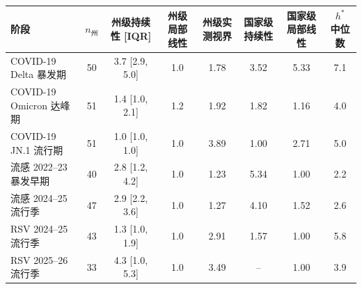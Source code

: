 \begin{tabular}{lccccccc}
\toprule
阶段 & $n_{\text{州}}$ & 州级持续性 [IQR] & 州级局部线性 & 州级实测视界 & 国家级持续性 & 国家级局部线性 & $h^*$ 中位数 \\
\midrule
COVID-19 Delta 暴发期 & 50 & 3.7 [2.9, 5.0] & 1.0 & 1.78 & 3.52 & 5.33 & 7.1 \\
COVID-19 Omicron 达峰期 & 51 & 1.4 [1.0, 2.1] & 1.2 & 1.92 & 1.82 & 1.16 & 4.0 \\
COVID-19 JN.1 流行期 & 51 & 1.0 [1.0, 1.0] & 1.0 & 3.89 & 1.00 & 2.71 & 5.0 \\
流感 2022--23 暴发早期 & 40 & 2.8 [1.2, 4.2] & 1.0 & 1.23 & 5.34 & 1.00 & 2.2 \\
流感 2024--25 流行季 & 47 & 2.9 [2.2, 3.6] & 1.0 & 1.27 & 4.10 & 1.52 & 2.6 \\
RSV 2024--25 流行季 & 43 & 1.3 [1.0, 1.9] & 1.0 & 2.91 & 1.57 & 1.00 & 5.8 \\
RSV 2025--26 流行季 & 33 & 4.3 [1.0, 5.3] & 1.0 & 3.49 & -- & 1.00 & 3.9 \\
\bottomrule
\end{tabular}
